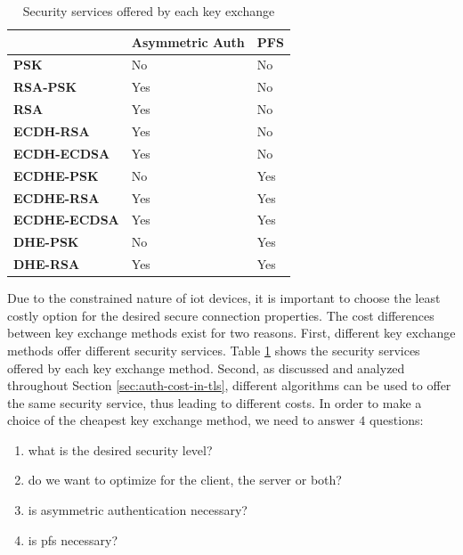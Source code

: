 \documentclass{llncs}
\begin{document}
\begin{table}[]
\begin{tabular}{|l|l|l|}
\hline
                     & \textbf{Asymmetric Auth} & \textbf{PFS} \\ \hline
\textbf{PSK}         & No                       & No           \\ \hline
\textbf{RSA-PSK}     & Yes                      & No           \\ \hline
\textbf{RSA}         & Yes                      & No           \\ \hline
\textbf{ECDH-RSA}    & Yes                      & No           \\ \hline
\textbf{ECDH-ECDSA}  & Yes                      & No           \\ \hline
\textbf{ECDHE-PSK}   & No                       & Yes          \\ \hline
\textbf{ECDHE-RSA}   & Yes                      & Yes          \\ \hline
\textbf{ECDHE-ECDSA} & Yes                      & Yes          \\ \hline
\textbf{DHE-PSK}     & No                       & Yes          \\ \hline
\textbf{DHE-RSA}     & Yes                      & Yes          \\ \hline
\end{tabular}
\centering \caption{\label{table:key-exch-sec-ser} Security services offered by each key exchange}
\end{table}


Due to the constrained nature of \gls{iot} devices, it is important to choose the least costly option for the desired secure
connection properties.
The cost differences between key exchange methods exist for two reasons. First, different key exchange methods offer different
security services. Table \ref{table:key-exch-sec-ser} shows the security services offered by each key exchange method. Second, as
discussed and analyzed throughout Section \ref{sec:auth-cost-in-tls}, different algorithms can be used to offer the same
security service, thus leading to different costs. In order to make a choice of the cheapest key
exchange method, we need to answer $4$ questions:

\begin{enumerate}
  \item what is the desired security level?
  \item do we want to optimize for the client, the server or both?
  \item is asymmetric authentication necessary?
  \item is \gls{pfs} necessary?
\end{enumerate}
\end{document}
